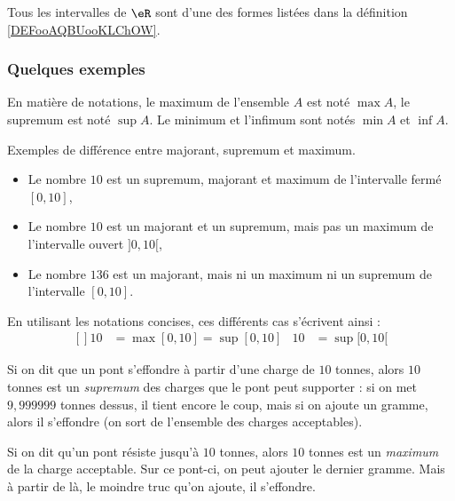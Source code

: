 \begin{proposition}     \label{PROPooHPMWooQJXCAS}
    Tous les intervalles de \( \eR\) sont d'une des formes listées dans la définition \ref{DEFooAQBUooKLChOW}.
\end{proposition}

\subsubsection{Quelques exemples}

En matière de notations, le maximum de l'ensemble $A$ est noté $\max A$, le supremum est noté $\sup A$. Le minimum et l'infimum sont notés $\min A$ et $\inf A$.

\begin{example}
Exemples de différence entre majorant, supremum et maximum.
\begin{itemize}
\item Le nombre $10$ est un supremum, majorant et maximum de l'intervalle fermé $[0,10]$,
\item Le nombre $10$ est un majorant et un supremum, mais pas un maximum de l'intervalle ouvert $]0,10[$,
\item Le nombre $136$ est un majorant, mais ni un maximum ni un supremum de l'intervalle $[0,10]$.
\end{itemize}
\end{example}

En utilisant les notations concises, ces différents cas s'écrivent ainsi :
\begin{equation}
    \begin{aligned}[]
10&=\max[0,10]=\sup[0,10]	& 10&=\sup[0,10[
    \end{aligned}
\end{equation}


\begin{example}
Si on dit que un pont s'effondre à partir d'une charge de $10$ tonnes, alors $10$ tonnes est un \emph{supremum} des charges que le pont peut supporter : si on met $9,999999$ tonnes dessus, il tient encore le coup, mais si on ajoute un gramme, alors il s'effondre (on sort de l'ensemble des charges acceptables).
\end{example}

\begin{example}
Si on dit qu'un pont résiste jusqu'à $10$ tonnes, alors $10$ tonnes est un \emph{maximum} de la charge acceptable. Sur ce pont-ci, on peut ajouter le dernier gramme. Mais à partir de là, le moindre truc qu'on ajoute, il s'effondre.
\end{example}


